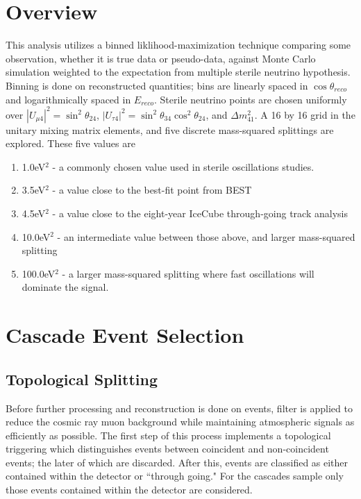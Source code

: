 \documentclass[main.tex]{subfiles}
\begin{document}
\section{Overview}

This analysis utilizes a binned liklihood-maximization technique comparing some observation, whether it is true data or pseudo-data, against Monte Carlo simulation weighted to the expectation from multiple sterile neutrino hypothesis. 
Binning is done on reconstructed quantities; bins are linearly spaced in $\cos\theta_{reco}$ and logarithmically spaced in $E_{reco}$. 
Sterile neutrino points are chosen uniformly over $\left|U_{\mu 4}\right|^{2}=\sin^{2}\theta_{24}$, $\left|U_{\tau 4}\right|^{2}=\sin^{2}\theta_{34}\cos^{2}\theta_{24}$, and $\Delta m_{41}^{2}$. 
A 16 by 16 grid in the unitary mixing matrix elements, and five discrete mass-squared splittings are explored. 
These five values are 
\begin{enumerate}
    \item 1.0eV$^{2}$ - a commonly chosen value used in sterile oscillations studies. 
    \item 3.5eV$^{2}$ - a value close to the best-fit point from BEST~\cite{barinov2021results}
    \item 4.5eV$^{2}$ - a value close to the eight-year IceCube through-going track analysis~\cite{Aartsen_2020, Aartsen_2020_prd}
    \item 10.0eV$^{2}$ - an intermediate value between those above, and larger mass-squared splitting
    \item 100.0eV$^{2}$ - a larger mass-squared splitting where fast oscillations will dominate the signal. 
\end{enumerate}



\section{Cascade Event Selection}

\subsection{Topological Splitting}

Before further processing and reconstruction is done on events, filter is applied to reduce the cosmic ray muon background while maintaining atmospheric signals as efficiently as possible. 
The first step of this process implements a topological triggering which distinguishes events between coincident and non-coincident events; the later of which are discarded. 
After this, events are classified as either contained within the detector or ``through going." For the cascades sample only those events contained within the detector are considered. 
\end{document}
